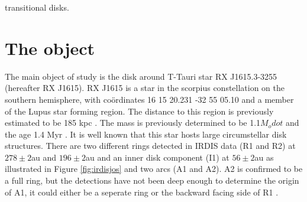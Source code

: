 \documentclass[twoside,single]{lion-msc}
\begin{document}


transitional disks.

\section{The object}
The main object of study is the disk around T-Tauri star RX J1615.3-3255 (hereafter RX J1615). RX J1615 is a star in the scorpius constellation on the southern hemisphere, with co\"ordinates 16 15 20.231 -32 55 05.10 and a member of the Lupus star forming region. The distance to this region is previously estimated to be 185 kpc \cite{Krautter1997}. The mass is previously determined to be 1.1$M_odot$ and the age 1.4 Myr \cite{Wahhaj2010}. It is well known that this star hosts large circumstellar disk structures. There are two different rings detected in IRDIS data (R1 and R2) at $278\pm 2$au and $196\pm 2$au and an inner disk component (I1) at $56\pm 2$au as illustrated in Figure \ref{fig:irdisjos} and two arcs (A1 and A2). A2 is confirmed to be a full ring, but the detections have not been deep enough to determine the origin of A1, it could either be a seperate ring or the backward facing side of R1 \cite{DeBoer2016}.
\noindent 
\bigskip
\end{document}

